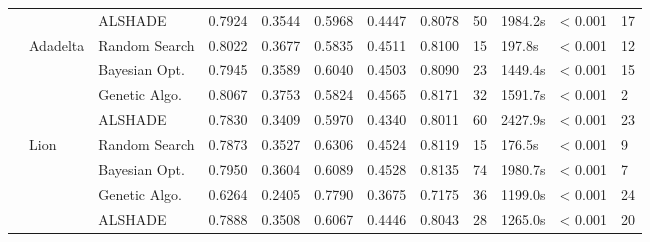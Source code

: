 \documentclass[conference]{IEEEtran}
\begin{document}
\begin{table}[t]
\begin{tabular}{llllllllllll}
 &  & ALSHADE & 0.7924 & 0.3544 & 0.5968 & 0.4447 & 0.8078 & 50 & 1984.2s & < 0.001 & 17 \\
\cline{2-12}
 & \multirow{4}{*}{ Adadelta} & Random Search & 0.8022 & 0.3677 & 0.5835 & 0.4511 & 0.8100 & 15 & 197.8s & < 0.001 & 12 \\
 &  & Bayesian Opt. & 0.7945 & 0.3589 & 0.6040 & 0.4503 & 0.8090 & 23 & 1449.4s & < 0.001 & 15 \\
 &  & Genetic Algo. & 0.8067 & 0.3753 & 0.5824 & 0.4565 & 0.8171 & 32 & 1591.7s & < 0.001 & 2 \\
 &  & ALSHADE & 0.7830 & 0.3409 & 0.5970 & 0.4340 & 0.8011 & 60 & 2427.9s & < 0.001 & 23 \\
\cline{2-12}
 & \multirow{4}{*}{ Lion} & Random Search & 0.7873 & 0.3527 & 0.6306 & 0.4524 & 0.8119 & 15 & 176.5s & < 0.001 & 9 \\
 &  & Bayesian Opt. & 0.7950 & 0.3604 & 0.6089 & 0.4528 & 0.8135 & 74 & 1980.7s & < 0.001 & 7 \\
 &  & Genetic Algo. & 0.6264 & 0.2405 & 0.7790 & 0.3675 & 0.7175 & 36 & 1199.0s & < 0.001 & 24 \\
 &  & ALSHADE & 0.7888 & 0.3508 & 0.6067 & 0.4446 & 0.8043 & 28 & 1265.0s & < 0.001 & 20 \\
\bottomrule
\end{tabular}
\end{table}
\end{document}
